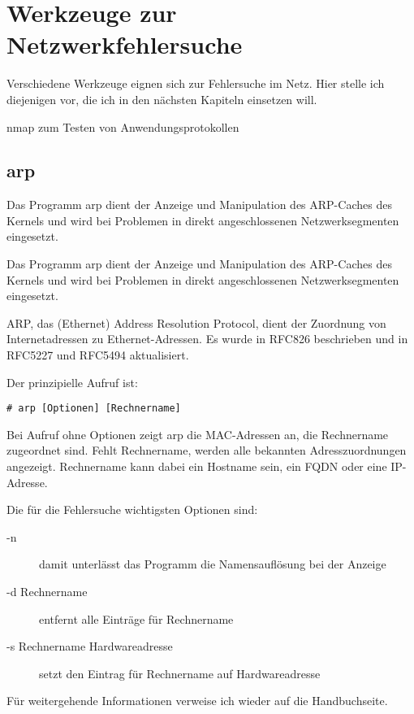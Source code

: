\chapter{Werkzeuge zur Netzwerkfehlersuche}
\label{cha:netz-werkzeuge}

\begin{abstractsec}
  Verschiedene Werkzeuge eignen sich zur Fehlersuche im Netz. Hier stelle ich
  diejenigen vor, die ich in den nächsten Kapiteln einsetzen will.
\end{abstractsec}

\begin{notes}
\item[nmap] zum Testen von Anwendungsprotokollen
\end{notes}

\section{arp}
\label{sec:netz-werkzeuge-arp}
\begin{abstractsec}
  Das Programm arp dient der Anzeige und Manipulation des ARP-Caches des
  Kernels und wird bei Problemen in direkt angeschlossenen Netzwerksegmenten
  eingesetzt.
\end{abstractsec}
\begin{normaltext}
  Das Programm arp dient der Anzeige und Manipulation des ARP-Caches des
  Kernels und wird bei Problemen in direkt angeschlossenen Netzwerksegmenten
  eingesetzt.

  ARP, das (Ethernet) Address Resolution Protocol, dient der Zuordnung von
  Internetadressen zu Ethernet-Adressen. Es wurde in RFC826 beschrieben und in
  RFC5227 und RFC5494 aktualisiert.

  Der prinzipielle Aufruf ist:
  \begin{verbatim}
# arp [Optionen] [Rechnername]
  \end{verbatim}

  Bei Aufruf ohne Optionen zeigt arp die MAC-Adressen an, die Rechnername
  zugeordnet sind. Fehlt Rechnername, werden alle bekannten Adresszuordnungen
  angezeigt. Rechnername kann dabei ein Hostname sein, ein FQDN oder eine
  IP-Adresse.

  Die für die Fehlersuche wichtigsten Optionen sind:
  \begin{description}
    \item[-n] damit unterlässt das Programm die Namensauflösung bei der
      Anzeige
    \item[-d Rechnername] entfernt alle Einträge für Rechnername
    \item[-s Rechnername Hardwareadresse] setzt den Eintrag für Rechnername
      auf Hardwareadresse
  \end{description}
  Für weitergehende Informationen verweise ich wieder auf die Handbuchseite.
\end{normaltext}

